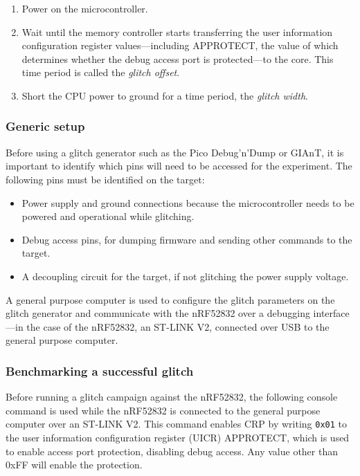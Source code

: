 \begin{enumerate}
\def\labelenumi{\arabic{enumi}.}
\tightlist
\item
  Power on the microcontroller.
\item
  Wait until the memory controller starts transferring the user
  information configuration register values---including APPROTECT, the
  value of which determines whether the debug access port is
  protected---to the core. This time period is called the \emph{glitch
  offset}.
\item
  Short the CPU power to ground for a time period, the \emph{glitch
  width}.
\end{enumerate}

\hypertarget{generic-setup}{%
\subsubsection{Generic setup}\label{generic-setup}}

Before using a glitch generator such as the Pico Debug'n'Dump or GIAnT,
it is important to identify which pins will need to be accessed for the
experiment. The following pins must be identified on the target:

\begin{itemize}
\tightlist
\item
  Power supply and ground connections because the microcontroller needs
  to be powered and operational while glitching.
\item
  Debug access pins, for dumping firmware and sending other commands to
  the target.
\item
  A decoupling circuit for the target, if not glitching the power supply
  voltage.
\end{itemize}

A general purpose computer is used to configure the glitch parameters on
the glitch generator and communicate with the nRF52832 over a debugging
interface---in the case of the nRF52832, an ST-LINK V2, connected over
USB to the general purpose computer.

\hypertarget{benchmarking-a-successful-glitch}{%
\subsubsection{Benchmarking a successful
glitch}\label{benchmarking-a-successful-glitch}}

Before running a glitch campaign against the nRF52832, the following
console command is used while the nRF52832 is connected to the general
purpose computer over an ST-LINK V2. This command enables CRP by writing
\texttt{0x01} to the user information configuration register (UICR)
APPROTECT, which is used to enable access port protection, disabling
debug access. Any value other than 0xFF will enable the protection.

